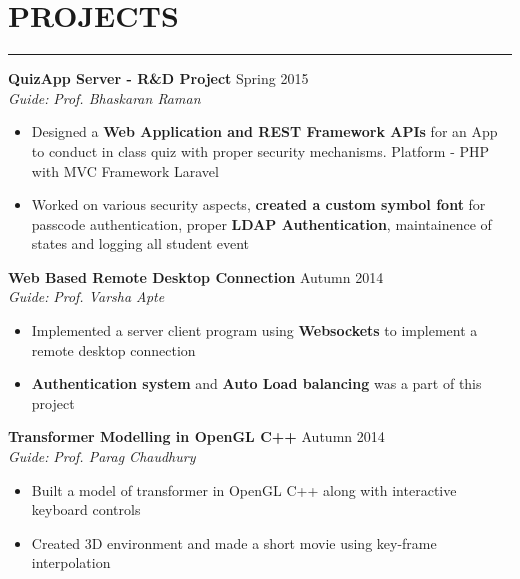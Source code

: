 \documentclass[11pt]{article} %
\begin{document}
\section*{PROJECTS}
\vspace{-3mm}
\hrule
\medskip

\noindent \textbf{QuizApp Server - R\&D Project} \hfill Spring 2015 \vspace{-0.5mm}\\
\textit{Guide:} \textit{Prof. Bhaskaran Raman}
\vspace{-3mm}
\begin{itemize}
\itemsep-0.4em
\item Designed a \textbf{Web Application and REST Framework APIs} for an App to conduct in class quiz with proper security mechanisms. Platform - PHP with MVC Framework Laravel
\item Worked on various security aspects, \textbf{created a custom symbol font} for passcode authentication, proper \textbf{LDAP Authentication}, maintainence of states and logging all student event
\end{itemize}
\vspace{-2mm}

\noindent \textbf{Web Based Remote Desktop Connection} \hfill Autumn 2014 \vspace{-0.5mm}\\
\textit{Guide:} \textit{Prof. Varsha Apte}
\vspace{-3mm}
\begin{itemize}
\itemsep-0.4em
\item Implemented a server client program using \textbf{Websockets} to implement a remote desktop connection
\item \textbf{Authentication system} and \textbf{Auto Load balancing} was a part of this project
\end{itemize}
\vspace{-2mm}

\noindent \textbf{Transformer Modelling in OpenGL C++} \hfill Autumn 2014 \vspace{-0.5mm}\\
\textit{Guide:} \textit{Prof. Parag Chaudhury}
\vspace{-3mm}
\begin{itemize}
\itemsep-0.4em
\item Built a model of transformer in OpenGL C++ along with interactive keyboard controls
\item Created 3D environment and made a short movie using key-frame interpolation
\end{itemize}
\vspace{-3mm}
\newpage
\end{document}
